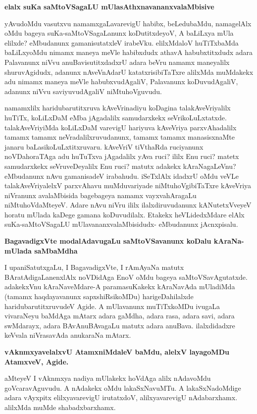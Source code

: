 {\bigskip
\noindent
{\large\bf elalx suKa saMtoVSagaLU mUlasAthxnavananxvalaMbisive}}\label{page194}
\smallskip

\noindent
yAvudoMdu vasutxvu namamxgaLavarevigU habibx, beLedubaMdu, namagelAlx oMdu bageya suKa-\-saMtoVSagaLanunx koDutitxdeyoV, A baLiLxya mUla elilxde? eMbudanunx gamanisutatxleV irabeVku. elilxMdaloV huTiTxbaMda baLiLxyoMdu nimamx maneya meVle habibxdudx athavA habubxtitxdudx adara Pala\-vanunx niVvu anuBavisutitxdadxrU adara beVru namamx maneyalilx shuruvAgidudx, adanunx nAveVnAdarU katatxrisi\-biTaTxre alilxMda muMdakekx adu nimamx maneya meVle habubxvudAgaliV, Palavanunx koDuvudA\-galiV, adanunx\- niVvu saviyuvudAgaliV niMtuhoVguvudu. 

namamxlilx haridubarutitxruva kAveVrinadiyu koDagina talakAveVriyalilx huTiTx, koLiLxDaM eMba jAgadalilx samudarxkekx seVrikoLuLxtatxde. talakAveVri\-yiMda koLiLxDaM varevigU hariyuva kAveVriya parxvAhadalilx tamamx tamamx neVradalilxruvudanunx, tamamx tamamx manasisxnaMte janaru baLasikoLuLxtitxruvaru. kAveVriV tiVthaRda ruciyanunx noVDahoraTAga adu huTuTxva jAgadalilx yAva ruci? ililx Enu ruci? matetx samudarxkekx seVruveDeyalilx Enu ruci? matutx adakekx kAraNagaLeVnu? eMbudanunx nAvu gamanisadeV irabahudu. iSeTxlAlx idadxrU oMdu veVLe talakAveVriyalelxV parxvAhavu muMduvariyade niMtuhoVgibiTaTxre kAveVriya niVranunx avalaMbisida bagebageya namamx vayxvahAragaLu niMtuhoVdaMteyeV. Adare nAvu niVru ililx ilalxdiruvudanunx kANutetxVveyeV horatu mUlada kaDege gamana koDuvudilalx. Etakekx heVLidedxMdare elAlx suKa-\-saMtoVSagaLU mUlavananxvalaMbisidudx- eMbudanunx jAcnxpisalu.

{\medskip
\noindent
{\large\bf BagavadigxVte modalAdavugaLu saMtoVSavanunx koDalu kAraNa-mUlada saMbaMdha}}\label{page195}
\smallskip

\noindent
I upaniSatutxgaLu, I BagavadigxVte, I rAmAyaNa matutx BAratAdigaLanenxlAlx noVDi\-dAga EnoV oMdu bageya saMtoVSavAgutatxde. adakekxVnu kAraNa\-veMdare-A paramasuKakekx kAraNavAda mUla\-diMda (tamamx haqdayavanunx sapxshiRsi\-koMDu) harigeDahilalxde haridubarutitxruvudeV Agide. A mUlavanunx muTiTx\-koMDu ivugaLa vivaraNeyu baMdAga mAtarx adara gaMdha, adara rasa, adara savi, adara swMdarayx, adara BAvAnuBAvagaLu matutx adara anuBava. ilalxdidadxre keVvala niVrasavAda  anukaraNa mAtarx.

{\medskip
\noindent
{\large\bf vAknmxyavelalxvU AtamxniMdaleV baMdu, alelxV layagoMDu AtamxveV, Agide.}}\label{195}
\smallskip

\noindent
aMteyeV I vAknmxya nadiya mUlakekx hoVdAga alilx nAdavoMdu goVcaravAguvudu. A nAdakekx oMdu lakaSxNavuMTu. A lakaSxNadoMdige adara vAyxpitx elilxyavarevigU irutatxdoV, alilxyavare\-vigU nAdabarxhamx. alilxMda muMde shabadxbarxhamx. 

